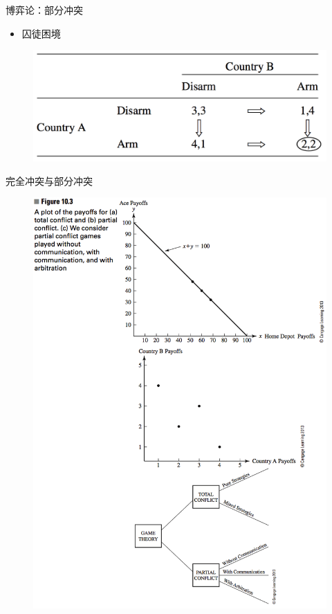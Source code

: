 \documentclass[mathserif, table]{beamer}
\begin{document}
\begin{frame}{博弈论：部分冲突}

  \begin{itemize}
  \item 囚徒困境
  \end{itemize}

  \begin{figure}
    \includegraphics[width=0.8\textwidth{}]{country.png}
  \end{figure}
  
\end{frame}

\begin{frame}{完全冲突与部分冲突}
  
  \begin{figure}
    \includegraphics[height=0.8\textheight{}]{game.png}
  \end{figure}

\end{frame}
\end{document}
